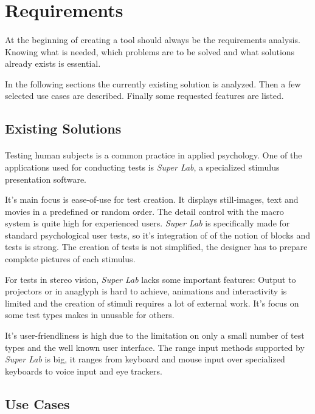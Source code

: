 \section{Requirements\label{Requirements}}
\paragraph{}
At the beginning of creating a tool should always be the requirements analysis.
Knowing what is needed, which problems are to be solved and what solutions already exists is essential.

In the following sections the currently existing solution is analyzed.
Then a few selected use cases are described.
Finally some requested features are listed.

\subsection{Existing Solutions}
\paragraph{}
Testing human subjects is a common practice in applied psychology.
One of the applications used for conducting tests is \textit{Super Lab}\cite{superlab}, a specialized stimulus presentation software.

It's main focus is ease-of-use for test creation.
It displays still-images, text and movies in a predefined or random order.
The detail control with the macro system is quite high for experienced users.
\textit{Super Lab} is specifically made for standard psychological user tests, so it's integration of of the notion of blocks and tests is strong.
The creation of tests is not simplified, the designer has to prepare complete pictures of each stimulus.

For tests in stereo vision, \textit{Super Lab} lacks some important features:
Output to projectors or in anaglyph is hard to achieve, animations and interactivity is limited and the creation of stimuli requires a lot of external work.
It's focus on some test types makes in unusable for others.

It's user-friendliness is high due to the limitation on only a small number of test types and the well known user interface.
The range input methods supported by \textit{Super Lab} is big, it ranges from keyboard and mouse input over specialized keyboards to voice input and eye trackers.


\subsection{Use Cases}
